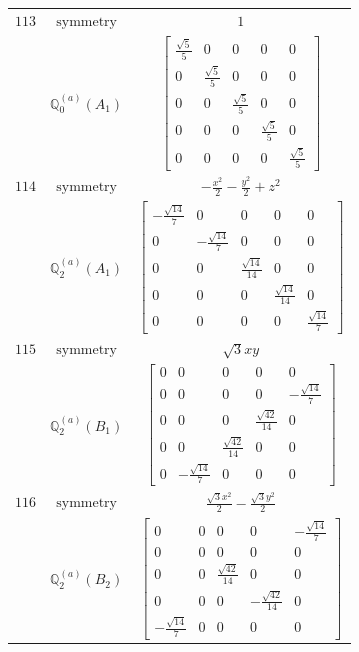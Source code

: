 \documentclass[fleqn,8pt,landscape]{jsarticle}
\begin{document}
\begin{longtable}{ccc}
$ 113 $ & $ \text{symmetry} $ & $ 1 $ \\
$  $ & $ \mathbb{Q}_{0}^{(a)}(A_{1}) $ & $ \begin{bmatrix} \frac{\sqrt{5}}{5} & 0 & 0 & 0 & 0 \\ 0 & \frac{\sqrt{5}}{5} & 0 & 0 & 0 \\ 0 & 0 & \frac{\sqrt{5}}{5} & 0 & 0 \\ 0 & 0 & 0 & \frac{\sqrt{5}}{5} & 0 \\ 0 & 0 & 0 & 0 & \frac{\sqrt{5}}{5} \end{bmatrix} $ \\ \hline
$ 114 $ & $ \text{symmetry} $ & $ - \frac{x^{2}}{2} - \frac{y^{2}}{2} + z^{2} $ \\
$  $ & $ \mathbb{Q}_{2}^{(a)}(A_{1}) $ & $ \begin{bmatrix} - \frac{\sqrt{14}}{7} & 0 & 0 & 0 & 0 \\ 0 & - \frac{\sqrt{14}}{7} & 0 & 0 & 0 \\ 0 & 0 & \frac{\sqrt{14}}{14} & 0 & 0 \\ 0 & 0 & 0 & \frac{\sqrt{14}}{14} & 0 \\ 0 & 0 & 0 & 0 & \frac{\sqrt{14}}{7} \end{bmatrix} $ \\ \hline
$ 115 $ & $ \text{symmetry} $ & $ \sqrt{3} x y $ \\
$  $ & $ \mathbb{Q}_{2}^{(a)}(B_{1}) $ & $ \begin{bmatrix} 0 & 0 & 0 & 0 & 0 \\ 0 & 0 & 0 & 0 & - \frac{\sqrt{14}}{7} \\ 0 & 0 & 0 & \frac{\sqrt{42}}{14} & 0 \\ 0 & 0 & \frac{\sqrt{42}}{14} & 0 & 0 \\ 0 & - \frac{\sqrt{14}}{7} & 0 & 0 & 0 \end{bmatrix} $ \\ \hline
$ 116 $ & $ \text{symmetry} $ & $ \frac{\sqrt{3} x^{2}}{2} - \frac{\sqrt{3} y^{2}}{2} $ \\
$  $ & $ \mathbb{Q}_{2}^{(a)}(B_{2}) $ & $ \begin{bmatrix} 0 & 0 & 0 & 0 & - \frac{\sqrt{14}}{7} \\ 0 & 0 & 0 & 0 & 0 \\ 0 & 0 & \frac{\sqrt{42}}{14} & 0 & 0 \\ 0 & 0 & 0 & - \frac{\sqrt{42}}{14} & 0 \\ - \frac{\sqrt{14}}{7} & 0 & 0 & 0 & 0 \end{bmatrix} $ \\ \hline

\end{longtable}
\end{document}
